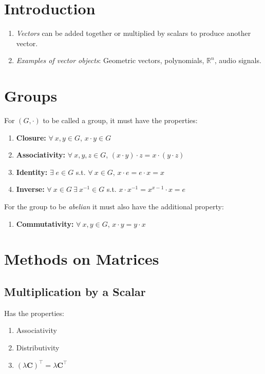 \documentclass[10pt,twoside,twocolumn]{article}
\newcommand{\R}[0]{\mathds{R}} %
\begin{document}
\section{Introduction}
\begin{enumerate}
\item \emph{Vectors} can be added together or multiplied by scalars to produce
another vector. 
\item \emph{Examples of vector objects}: Geometric vectors, polynomials,
$\R^{n}$, audio signals.
\end{enumerate}

\section{Groups}

For $\left(G,\cdot\right)$ to be called a group, it must have the
properties: 
\begin{enumerate}
\item \textbf{Closure:} $\forall\:x,y\in G$, $x\cdot y\in G$ 
\item \textbf{Associativity:} $\forall\:x,y,z\in G$, $\left(x\cdot y\right)\cdot z=x\cdot\left(y\cdot z\right)$ 
\item \textbf{Identity:} $\exists\;e\in G$ s.t. $\forall\:x\in G$, $x\cdot e=e\cdot x=x$ 
\item \textbf{Inverse:} $\forall\:x\in G\:\exists\:x^{-1}\in G$ s.t. $x\cdot x^{-1}=x^{x-1}\cdot x=e$ 
\end{enumerate}
For the group to be \emph{abelian} it must also have the additional
property: 
\begin{enumerate}
\item \textbf{Commutativity:} $\forall\:x,y\in G$, $x\cdot y=y\cdot x$ 
\end{enumerate}

\section{Methods on Matrices}


\subsection{Multiplication by a Scalar}

Has the properties: 
\begin{enumerate}
\item Associativity 
\item Distributivity 
\item $\left(\lambda\mathbf{C}\right)^{\top}=\lambda\mathbf{C}^{\top}$ 
\end{enumerate}
\end{document}
